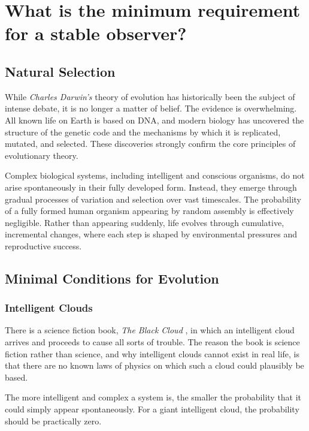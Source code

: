 \chapter{What is the minimum requirement for a stable observer?}
\label{chap:evoluton-of-life}

\section{Natural Selection}

While \textit{Charles Darwin's} theory of evolution has historically been the subject of intense debate, it is no longer a matter of belief. The evidence is overwhelming.
All known life on Earth is based on DNA, and modern biology has uncovered the structure of the genetic code and the mechanisms by which it is replicated, mutated, and selected.
These discoveries strongly confirm the core principles of evolutionary theory.

Complex biological systems, including intelligent and conscious organisms, do not arise spontaneously in their fully developed form.
Instead, they emerge through gradual processes of variation and selection over vast timescales.
The probability of a fully formed human organism appearing by random assembly is effectively negligible.
Rather than appearing suddenly, life evolves through cumulative, incremental changes, where each step is shaped by environmental pressures and reproductive success.


\section{Minimal Conditions for Evolution}

\subsection*{Intelligent Clouds}

There is a science fiction book, \emph{The Black Cloud} \cite{hoyle1957blackcloud},
in which an intelligent cloud arrives and proceeds to cause all sorts
of trouble. The reason the book is science fiction rather than science,
and why intelligent clouds cannot exist in real life, is that there are
no known laws of physics on which such a cloud could plausibly be based.

The more intelligent and complex a system is, the smaller the
probability that it could simply appear spontaneously. For a giant
intelligent cloud, the probability should be practically zero.

